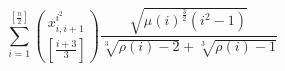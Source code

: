 \documentclass{amsart}
\begin{document}
\[
    \sum_{i=1}^{\left[\frac{n}{2}\right]}
    \binom{x^{i^2}_{i,i+1}}
        {\left[\frac{i+3}{3}\right]}
    \frac{\sqrt{\mu(i)^{\frac{3}{2}}(i^2-1)}}
        {\sqrt[3]{\rho(i)-2} + \sqrt[3]{\rho(i)-1}}
\]
\end{document}
